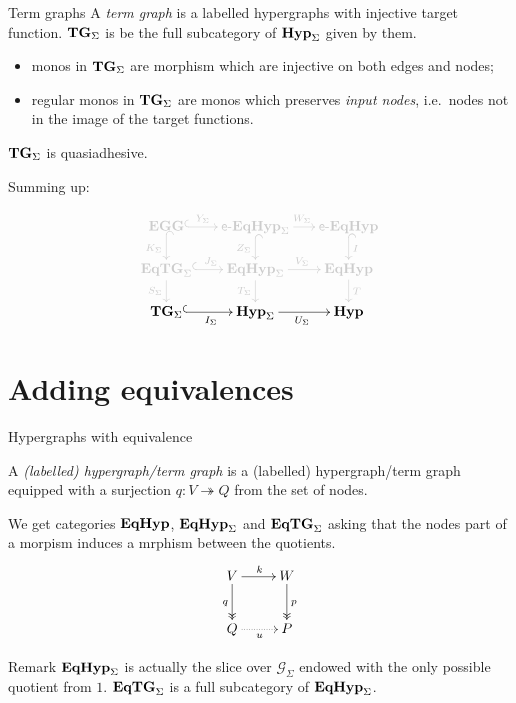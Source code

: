 \documentclass[aspectratio=169]{beamer}
\newcommand{\catname}[1]{\textbf{\textup{#1}}}
\newcommand{\tg}[0]{\catname{TG}_{\Sigma}}
\newcommand{\eg}{\catname{EGG}}
\newcommand{\egg}{\mathsf{e}\text{-}\catname{EqHyp}}
\newcommand{\hyp}{\catname{Hyp}}
\newcommand{\EqHyp}{\catname{EqHyp}} %
\newcommand{\EqHyps}{\catname{EqHyp}_{\Sigma}}
\newcommand{\EqTG}{\catname{EqTG}}
\newcommand{\eto}{\twoheadrightarrow}
\begin{document}
\begin{frame}{Term graphs}
A \emph{term graph} is a labelled hypergraphs with injective target function. $\tg$ is be the full subcategory of $\hyp_{\Sigma}$ given by them.

\pause 
\begin{itemize}
	\item monos in $\tg$ are morphism which are injective on both edges and nodes;\pause 
	\item regular monos in $\tg$ are monos which preserves \emph{input nodes}, i.e.~nodes not in the image of the target functions.
\end{itemize}
\pause 

\begin{theorem}
$\tg$ is quasiadhesive.
\end{theorem}

\end{frame}


\begin{frame}
	
	Summing up:
	
	
	\[\xymatrix@R=15pt@C=15pt{ \color{shaded}\eg \ar@{^{(}->}@[shaded][r]^-{\color{shaded}Y_\Sigma} \ar@{^{(}->}@[shaded][d]_{\color{shaded}K_\Sigma} & \color{shaded}\egg_\Sigma \ar@{^{(}->}@[shaded][d]_{\color{shaded} Z_\Sigma} \ar@[shaded][r]^{\color{shaded}W_\Sigma}&\color{shaded} \egg \ar@{^{(}->}@[shaded][d]^{\color{shaded}I}\\ \color{shaded}\EqTG_{\Sigma} \ar@{^{(}->}@[shaded][r]^{\color{shaded}J_\Sigma}\ar@[shaded][d]_{\color{shaded}S_\Sigma}&\color{shaded} \EqHyp_\Sigma \ar@[shaded][r]^{\color{shaded}V_\Sigma} \ar@[shaded][d]_{\color{shaded}T_\Sigma}&\color{shaded} \EqHyp \ar@[shaded][d]^{\color{shaded}T}\\ \tg \ar@{^{(}->}[r]_{I_\Sigma}& \hyp_{\Sigma} \ar[r]_{U_\Sigma}  &\hyp}\]
	
\end{frame}


\section{Adding equivalences}

\begin{frame}{Hypergraphs with equivalence}

A \emph{(labelled) hypergraph/term graph} is a (labelled) hypergraph/term graph equipped with a surjection $q\colon V\eto Q$ from the set of nodes. \pause 

We get categories $\EqHyp$, $\EqHyps$ and  $\EqTG_{\Sigma}$ asking that the nodes part of a morpism induces a mrphism between the quotients. 
\[\xymatrix{V \ar@{>>}[d]_{q} \ar[r]^{k}& W \ar@{>>}[d]^p\\ Q \ar@{.>}[r]_{u} & P }\]

\pause 

\begin{block}{Remark}\justifying
$\EqHyps$ is actually the slice over $\mathcal{G}_\Sigma$ endowed with the only possible quotient from $1$. $ \EqTG_{\Sigma}$ is a full subcategory of $\EqHyps$.
\end{block}
\end{frame}
\end{document}
